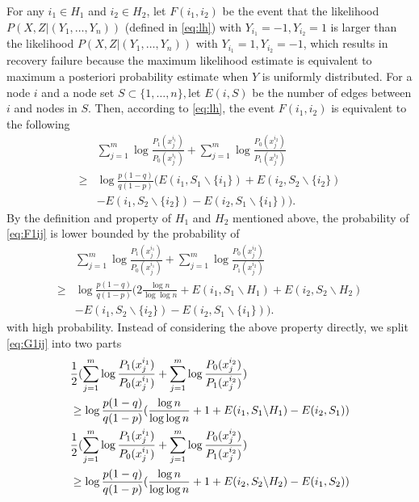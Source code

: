 \documentclass[conference]{IEEEtran}
\begin{document}
		For any $i_1\in H_1$ and $i_2\in H_2$, let $F(i_1,i_2)$ be the event that the likelihood $P(X,Z|(Y_1,\ldots,Y_n))$ (defined in \eqref{eq:lh}) with $Y_{i_1}=-1,Y_{i_2}=1$ is larger than the likelihood $P(X,Z|(Y_1,\ldots,Y_n))$ with $Y_{i_1}=1,Y_{i_2}=-1$, which results in  recovery failure because the maximum likelihood estimate is equivalent to maximum a posteriori probability estimate when $Y$ is uniformly distributed. For a node $i$ and a node set $S\subset\{1,\ldots,n\}, $let $E(i,S)$ be the number of edges between $i$ and nodes in $S$. Then, according to \eqref{eq:lh}, the event $F(i_1,i_2)$ is equivalent to  
		the following 
		\begin{align}
			&\sum_{j=1}^{m} \log \frac{P_1(x^{i_1}_{j})}{P_0(x^{i_1}_{j})}
			+\sum_{j=1}^{m} \log \frac{P_0(x^{i_2}_{j})}{P_1(x^{i_2}_{j})}\nonumber\\
			\ge &\log \frac{p(1-q)}{q(1-p)}(E(i_1, S_1 \backslash \{i_1\}) + E(i_2, S_2 \backslash \{i_2\})\nonumber\\
			&- E(i_1, S_2 \backslash \{i_2\}) - E(i_2, S_1 \backslash \{i_1\})) \label{eq:F1ij}.
		\end{align}		
		By the definition and property of $H_1$ and $H_2$ mentioned above, the probability of \eqref{eq:F1ij} is lower bounded by the probability of
		\begin{align}
			&\sum_{j=1}^{m} \log \frac{P_1(x^{i_1}_{j})}{P_0(x^{i_1}_{j})}
			+\sum_{j=1}^{m} \log \frac{P_0(x^{i_2}_{j})}{P_1(x^{i_2}_{j})}\nonumber\\   
			\ge &\log \frac{p(1-q)}{q(1-p)}(2\frac{\log n}{\log\log n}+E(i_1, S_1 \backslash H_1) + E(i_2, S_2 \backslash H_2)\nonumber\\
			&- E(i_1, S_2 \backslash \{i_2\}) - E(i_2, S_1 \backslash \{i_1\})) \label{eq:G1ij}.
		\end{align}
		with high probability.
				Instead of considering the above property directly, we split \eqref{eq:G1ij} into two parts
		\begin{align}
			&\frac{1}{2}(\sum_{j=1}^{m} \log \frac{P_1(x^{i_1}_{j})}{P_0(x^{i_1}_{j})}+\sum_{j=1}^{m} \log \frac{P_0(x^{i_2}_{j})}{P_1(x^{i_2}_{j})})
			   \notag\\
			& \geq\log \frac{p(1-q)}{q(1-p)}(\frac{\log n}{\log\log n} + 1 + E(i_1, S_1 \backslash H_1) - E(i_2, S_1)) \label{eq:single_side_Gi}\\
			&\frac{1}{2}(\sum_{j=1}^{m} \log \frac{P_1(x^{i_1}_{j})}{P_0(x^{i_1}_{j})}+\sum_{j=1}^{m} \log \frac{P_0(x^{i_2}_{j})}{P_1(x^{i_2}_{j})})
			 \notag \\
			& \geq   \log \frac{p(1-q)}{q(1-p)}(\frac{\log n}{\log\log n} + 1 +E(i_2, S_2 \backslash H_2)  - E(i_1, S_2))\label{eq:single_side_Gai}
		\end{align}
\end{document}
